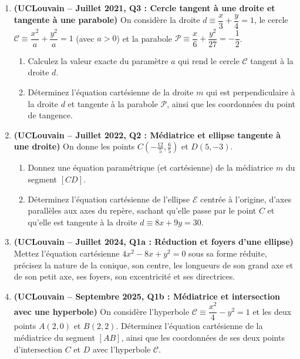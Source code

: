 \begin{enumerate}[label=\textbf{Exercice 6.\arabic* --}, align=left, leftmargin=*]
    \item \textbf{(UCLouvain -- Juillet 2021, Q3 : Cercle tangent à une droite et tangente à une parabole)}
    On considère la droite $d \equiv \dfrac{x}{3} + \dfrac{y}{4} = 1$, le cercle $\mathcal{C} \equiv \dfrac{x^2}{a} + \dfrac{y^2}{a} = 1$ (avec $a > 0$) et la parabole $\mathcal{P} \equiv \dfrac{x}{6} + \dfrac{y^2}{27} = -\dfrac{1}{2}$.
    \begin{enumerate}[label=(\alph*)]
        \item Calculez la valeur exacte du paramètre $a$ qui rend le cercle $\mathcal{C}$ tangent à la droite $d$.
        \item Déterminez l'équation cartésienne de la droite $m$ qui est perpendiculaire à la droite $d$ et tangente à la parabole $\mathcal{P}$, ainsi que les coordonnées du point de tangence.
    \end{enumerate}

    \item \textbf{(UCLouvain -- Juillet 2022, Q2 : Médiatrice et ellipse tangente à une droite)}
    On donne les points $C\left(-\frac{12}{5}, \frac{6}{5}\right)$ et $D(5, -3)$.
    \begin{enumerate}[label=(\alph*)]
        \item Donnez une équation paramétrique (et cartésienne) de la médiatrice $m$ du segment $[CD]$.
        \item Déterminez l'équation cartésienne de l'ellipse $\mathcal{E}$ centrée à l'origine, d'axes parallèles aux axes du repère, sachant qu'elle passe par le point $C$ et qu'elle est tangente à la droite $d \equiv 8x + 9y = 30$.
    \end{enumerate}

    \item \textbf{(UCLouvain -- Juillet 2024, Q1a : Réduction et foyers d'une ellipse)}
    Mettez l'équation cartésienne $4x^2 - 8x + y^2 = 0$ sous sa forme réduite, précisez la nature de la conique, son centre, les longueurs de son grand axe et de son petit axe, ses foyers, son excentricité et ses directrices.

    \item \textbf{(UCLouvain -- Septembre 2025, Q1b : Médiatrice et intersection avec une hyperbole)}
    On considère l'hyperbole $\mathcal{C} \equiv \dfrac{x^2}{4} - y^2 = 1$ et les deux points $A(2, 0)$ et $B(2, 2)$. Déterminez l'équation cartésienne de la médiatrice du segment $[AB]$, ainsi que les coordonnées de ses deux points d'intersection $C$ et $D$ avec l'hyperbole $\mathcal{C}$.


\end{enumerate}
